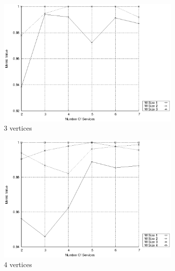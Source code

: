 \begin{figure}[ht]
  \centering
  \begin{subfigure}{0.33\textwidth}
    \includegraphics[width=\textwidth]{Images/graphs/window_quality_performance_diff_qual_n7_s7_20_100_n3}
    \caption{3 vertices}
    \label{fig:quality_window_average_qualitative_n3}
  \end{subfigure}
  \hfill
  \begin{subfigure}{0.33\textwidth}
    \includegraphics[width=\textwidth]{Images/graphs/window_quality_performance_diff_qual_n7_s7_20_100_n4}
    \caption{4 vertices}
    \label{fig:quality_window_average_qualitative_n4}
  \end{subfigure}
  \hfill
  \begin{subfigure}{0.33\textwidth}

\end{subfigure}
\end{figure}
